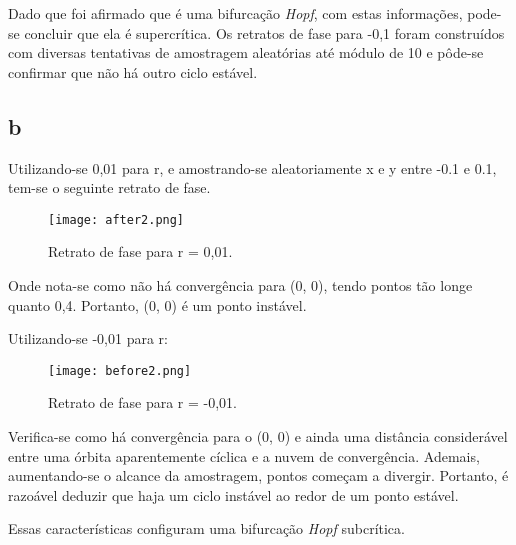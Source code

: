 \documentclass{article}[twocolumn]
\begin{document}
	Dado que foi afirmado que \'e uma bifurca\c{c}\~ao \textit{Hopf}, com estas informa\c{c}\~oes,
	pode-se concluir que ela \'e supercr\'itica. Os retratos de fase para -0,1 foram
	constru\'idos com diversas tentativas de amostragem aleat\'orias at\'e m\'odulo de 10 e
	p\^ode-se confirmar que n\~ao h\'a outro ciclo est\'avel.
	
	\subsection{b}
	Utilizando-se 0,01 para r, e amostrando-se aleatoriamente x e y entre -0.1 e 0.1,
	tem-se o seguinte retrato de fase.
	\begin{figure}[H]
		\centering
		\texttt{[image: after2.png]}
		\caption{Retrato de fase para r = 0,01.}
	\end{figure}
	Onde nota-se como n\~ao h\'a converg\^encia para (0, 0), tendo pontos t\~ao longe
	quanto 0,4. Portanto, (0, 0) \'e um ponto inst\'avel.

	Utilizando-se -0,01 para r:
	\begin{figure}[H]
		\centering
		\texttt{[image: before2.png]}
		\caption{Retrato de fase para r = -0,01.}
	\end{figure}
	Verifica-se como h\'a converg\^encia para o (0, 0) e ainda uma dist\^ancia consider\'avel
	entre uma \'orbita aparentemente c\'iclica e a nuvem de converg\^encia. Ademais,
	aumentando-se o alcance da amostragem, pontos come\c{c}am a divergir. Portanto,
	\'e razo\'avel deduzir que haja um ciclo inst\'avel ao redor de um ponto est\'avel.

	Essas caracter\'isticas configuram uma bifurca\c{c}\~ao \textit{Hopf} subcr\'itica.
\end{document}
